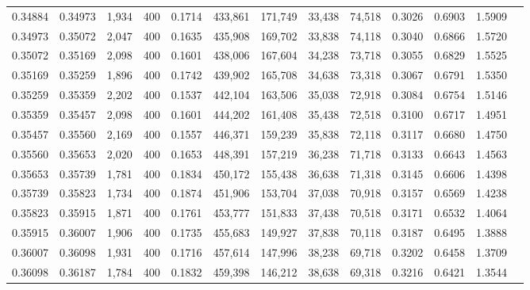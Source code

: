 \begin{tabular}{rrrrrrrrrrrrr}
0.34884 & 0.34973 &  1,934 &   400 &                                     0.1714 & 433,861 & 171,749 &  33,438 &  74,518 & 0.3026 & 0.6903 & 1.5909 \\
0.34973 & 0.35072 &  2,047 &   400 &                                     0.1635 & 435,908 & 169,702 &  33,838 &  74,118 & 0.3040 & 0.6866 & 1.5720 \\
0.35072 & 0.35169 &  2,098 &   400 &                                     0.1601 & 438,006 & 167,604 &  34,238 &  73,718 & 0.3055 & 0.6829 & 1.5525 \\
0.35169 & 0.35259 &  1,896 &   400 &                                     0.1742 & 439,902 & 165,708 &  34,638 &  73,318 & 0.3067 & 0.6791 & 1.5350 \\
0.35259 & 0.35359 &  2,202 &   400 &                                     0.1537 & 442,104 & 163,506 &  35,038 &  72,918 & 0.3084 & 0.6754 & 1.5146 \\
0.35359 & 0.35457 &  2,098 &   400 &                                     0.1601 & 444,202 & 161,408 &  35,438 &  72,518 & 0.3100 & 0.6717 & 1.4951 \\
0.35457 & 0.35560 &  2,169 &   400 &                                     0.1557 & 446,371 & 159,239 &  35,838 &  72,118 & 0.3117 & 0.6680 & 1.4750 \\
0.35560 & 0.35653 &  2,020 &   400 &                                     0.1653 & 448,391 & 157,219 &  36,238 &  71,718 & 0.3133 & 0.6643 & 1.4563 \\
0.35653 & 0.35739 &  1,781 &   400 &                                     0.1834 & 450,172 & 155,438 &  36,638 &  71,318 & 0.3145 & 0.6606 & 1.4398 \\
0.35739 & 0.35823 &  1,734 &   400 &                                     0.1874 & 451,906 & 153,704 &  37,038 &  70,918 & 0.3157 & 0.6569 & 1.4238 \\
0.35823 & 0.35915 &  1,871 &   400 &                                     0.1761 & 453,777 & 151,833 &  37,438 &  70,518 & 0.3171 & 0.6532 & 1.4064 \\
0.35915 & 0.36007 &  1,906 &   400 &                                     0.1735 & 455,683 & 149,927 &  37,838 &  70,118 & 0.3187 & 0.6495 & 1.3888 \\
0.36007 & 0.36098 &  1,931 &   400 &                                     0.1716 & 457,614 & 147,996 &  38,238 &  69,718 & 0.3202 & 0.6458 & 1.3709 \\
0.36098 & 0.36187 &  1,784 &   400 &                                     0.1832 & 459,398 & 146,212 &  38,638 &  69,318 & 0.3216 & 0.6421 & 1.3544 \\

\end{tabular}
